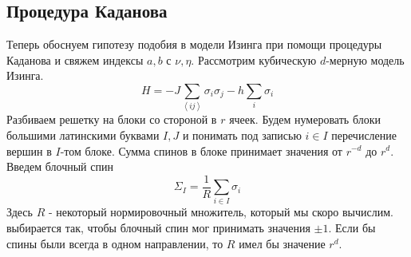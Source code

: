 \documentclass[a4paper,12pt]{article} \usepackage[utf8x]{inputenc} \usepackage[russian]{babel}
\theoremstyle{definition} \newtheorem{corollary}{Corollary}[theorem] \theoremstyle{definition}
\begin{document}
\subsection{Процедура Каданова}
\label{sec:kadanoff-procedure} Теперь обоснуем гипотезу подобия в модели Изинга при помощи процедуры
Каданова и свяжем индексы $a,b$ с $\nu,\eta$. Рассмотрим кубическую $d$-мерную модель Изинга.
\begin{equation}
  \label{eq:40} H=-J\sum_{\left<ij\right>}\sigma_i \sigma_j-h\sum_i \sigma_i
\end{equation} Разбиваем решетку на блоки со стороной в $r$ ячеек. Будем нумеровать блоки большими
латинскими буквами $I,J$ и понимать под записью $i\in I$ перечисление вершин в $I$-том блоке. Сумма
спинов в блоке принимает значения от $r^{-d}$ до $r^d$. Введем блочный спин
\begin{equation}
  \label{eq:41} \Sigma_I=\frac{1}{R}\sum_{i\in I}\sigma_i
\end{equation} Здесь $R$ - некоторый нормировочный множитель, который мы скоро вычислим. %
выбирается так, чтобы блочный спин мог принимать значения $\pm 1$. Если бы спины были всегда в одном
направлении, то $R$ имел бы значение $r^d$.
\end{document}
